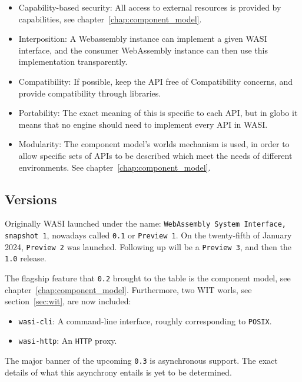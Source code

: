 \begin{itemize}
    \item Capability-based security: All access to external resources is provided by capabilities, see chapter~\ref{chap:component_model}.
    \item Interposition: A Webassembly instance can implement a given WASI interface, and the consumer WebAssembly instance can then use this implementation transparently.
    \item Compatibility: If possible, keep the \gls{API} free of Compatibility concerns, and provide compatibility through libraries.
    \item Portability: The exact meaning of this is specific to each \gls{API}, but in globo it means that no engine should need to implement every \gls{API} in \gls{WASI}.
    \item Modularity: The component model's worlds mechanism is used, in order to allow specific sets of APIs to be described which meet the needs of different environments. See chapter~\ref{chap:component_model}.
\end{itemize}



\subsection{Versions}
\label{sec:versions}

Originally \gls{WASI} launched under the name: \texttt{WebAssembly System Interface, snapshot 1}, nowadays called \texttt{0.1} or \texttt{Preview 1}. On the twenty-fifth of January 2024, \texttt{Preview 2} was launched. Following up will be a \texttt{Preview 3}, and then the \texttt{1.0} release.

The flagship feature that \texttt{0.2} brought to the table is the component model, see chapter~\ref{chap:component_model}. Furthermore, two \gls{WIT} worls, see section~\ref{sec:wit}, are now included:

\begin{itemize}
    \item \texttt{wasi-cli}: A command-line interface, roughly corresponding to \texttt{POSIX}.
    \item \texttt{wasi-http}: An \texttt{HTTP} proxy.
\end{itemize}

The major banner of the upcoming \texttt{0.3} is asynchronous support. The exact details of what this asynchrony entails is yet to be determined.

